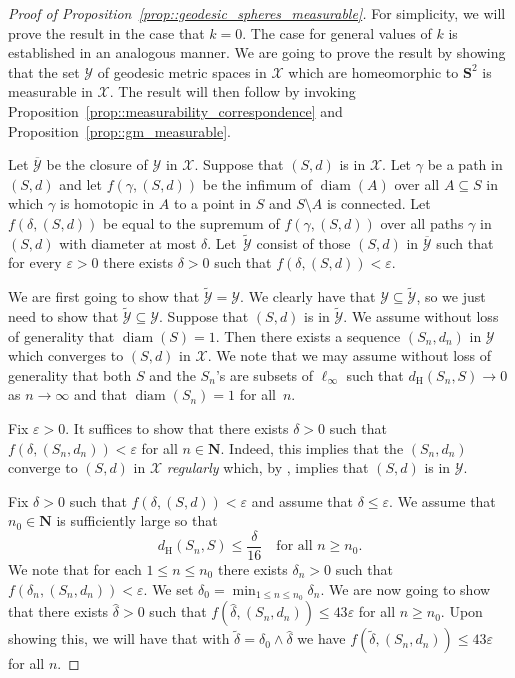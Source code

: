 \documentclass[JEP,XML,SOM,Unicode]{cedram}
\let\mathcal\mathscr
\let\epsilon\varepsilon
\theoremstyle{plain}
\numberwithin{theorem}{section}
\theoremstyle{definition}
\newcommand{\N}{\mathbf{N}}
\renewcommand{\S}{{\mathbf S}}
\DeclareMathOperator{\diam}{diam}
\newcommand{\gh}{{\mathcal X}}
\renewcommand{\dh}{d_{\mathrm{H}}}
\newcommand{\spheresgeo}{{\mathcal Y}}
\newcommand{\spheresgeoclose}{\ol{\spheresgeo}}
\let\ol\overline
\let\wh\widehat
\let\wt\widetilde
\begin{document}
\begin{proof}[Proof of Proposition~\ref{prop::geodesic_spheres_measurable}]
For simplicity, we will prove the result in the case that $k=0$. The case for general values of $k$ is established in an analogous manner. We are going to prove the result by showing that the set $\spheresgeo$ of geodesic metric spaces in $\gh$ which are homeomorphic to $\S^2$ is measurable in $\gh$. The result will then follow by invoking Proposition~\ref{prop::measurability_correspondence} and Proposition~\ref{prop::gm_measurable}.

Let $\spheresgeoclose$ be the closure of $\spheresgeo$ in $\gh$. Suppose that $(S,d)$ is in $\gh$. Let $\gamma$ be a path in $(S,d)$ and let $f(\gamma,(S,d))$ be the infimum of $\diam(A)$ over all $A \subseteq S$ in which $\gamma$ is homotopic in $A$ to a point in $S$ and $S \setminus A$ is connected. Let $f(\delta,(S,d))$ be equal to the supremum of $f(\gamma,(S,d))$ over all paths $\gamma$ in $(S,d)$ with diameter at most $\delta$. Let~$\wt{\spheresgeo}$ consist of those $(S,d)$ in $\spheresgeoclose$ such that for every $\epsilon > 0$ there exists $\delta > 0$ such that $f(\delta,(S,d)) < \epsilon$.

We are first going to show that $\wt{\spheresgeo}=\spheresgeo$. We clearly have that $\spheresgeo \subseteq \wt{\spheresgeo}$, so we just need to show that $\wt{\spheresgeo} \subseteq \spheresgeo$. Suppose that $(S,d)$ is in $\wt{\spheresgeo}$. We assume without loss of generality that $\diam(S) = 1$. Then there exists a sequence $(S_n,d_n)$ in $\spheresgeo$ which converges to $(S,d)$ in $\gh$. We note that we may assume without loss of generality that both $S$ and the $S_n$'s are subsets of $\ell_\infty$ such that $\dh(S_n,S) \to 0$ as $n \to \infty$ and that $\diam(S_n) = 1$ for all~$n$.

Fix $\epsilon > 0$. It suffices to show that there exists $\delta > 0$ such that $f(\delta,(S_n,d_n)) < \epsilon$ for all $n \in \N$. Indeed, this implies that the $(S_n,d_n)$ converge to $(S,d)$ in $\gh$ \emph{regularly} which, by \cite{begle_regular}, implies that $(S,d)$ is in $\spheresgeo$.

Fix $\delta > 0$ such that $f(\delta,(S,d)) < \epsilon$ and assume that $\delta \leq \epsilon$. We assume that $n_0 \in \N$ is sufficiently large so that
\begin{equation}
\label{eqn::ms_close}
\dh(S_n,S) \leq \frac{\delta}{16} \quad\text{for all } n \geq n_0.
\end{equation}
We note that for each $1 \leq n \leq n_0$ there exists $\delta_n > 0$ such that $f(\delta_n,(S_n,d_n)) < \epsilon$. We set $\delta_0 = \min_{1 \leq n \leq n_0} \delta_n$. We are now going to show that there exists $\wh{\delta} > 0$ such that $f(\wh{\delta},(S_n,d_n)) \leq 43 \epsilon$ for all $n \geq n_0$. Upon showing this, we will have that with $\wt{\delta} = \delta_0 \wedge \wh{\delta}$ we have $f(\wt{\delta},(S_n,d_n)) \leq 43\epsilon$ for all $n$.


\end{proof}
\end{document}
